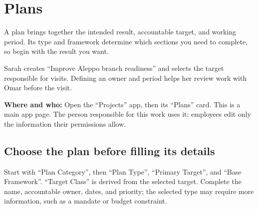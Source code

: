 
\clearpage
\section{Plans}
\label{sec:projects-feature-plans}

A plan brings together the intended result, accountable target, and working period. Its type and framework determine which sections you need to complete, so begin with the result you want.

\begin{rcnote}
Sarah creates “Improve Aleppo branch readiness” and selects the target responsible for visits. Defining an owner and period helps her review work with Omar before the visit.
\end{rcnote}

\textbf{Where and who:} Open the “Projects” app, then its “Plans” card. This is a main app page. The person responsible for this work uses it; employees edit only the information their permissions allow.

\subsection{Choose the plan before filling its details}
Start with “Plan Category”, then “Plan Type”, “Primary Target”, and “Base Framework”. “Target Class” is derived from the selected target. Complete the name, accountable owner, dates, and priority; the selected type may require more information, such as a mandate or budget constraint.

